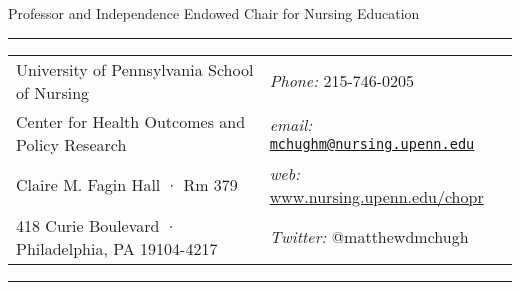 \documentclass[10pt,]{article}
\begin{document}
\raggedright

\centerline{\LARGE {}}

\vspace{2 mm}

\centerline{\large \sc Professor and Independence Endowed Chair for Nursing Education}

\vspace{2 mm}

\hrule
\begin{tabular}{@{}p{3.5in}p{4in}}
University of Pennsylvania School of Nursing  & \hspace{1in} {\textit {Phone:}}  215-746-0205 \\  
Center for Health Outcomes and Policy Research & \hspace{1in} {\textit {email:}}  {\ttfamily \href{mailto:mchughm@nursing.upenn.edu}{\nolinkurl{mchughm@nursing.upenn.edu}}} \\              
Claire M. Fagin Hall · Rm 379  & \hspace{1in} {\textit {web:}} \href{https://www.nursing.upenn.edu/chopr}{\ttfamily www.nursing.upenn.edu/chopr}\\       
418 Curie Boulevard · Philadelphia, PA 19104-4217  & \hspace{1in} {\textit {Twitter:}} {\ttfamily @matthewdmchugh}\\     
\end{tabular}

\vspace{2 mm}

\hrule
\end{document}
